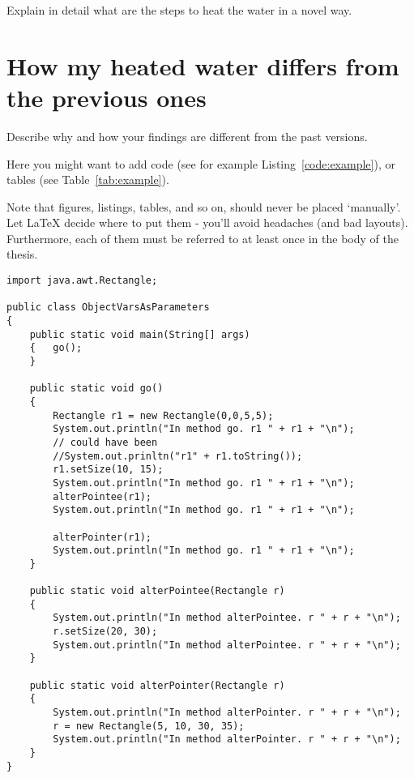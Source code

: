 Explain in detail what are the steps to heat the water in a novel way.

\section{How my heated water differs from the previous ones}

Describe why and how your findings are different from the past versions.

Here you might want to add code (see for example Listing~\ref{code:example}), or tables (see Table~\ref{tab:example}).

Note that figures, listings, tables, and so on, should never be placed `manually'. Let LaTeX decide where to put them - you'll avoid headaches (and bad layouts). Furthermore, each of them must be referred to at least once in the body of the thesis.

\begin{verbatim}
import java.awt.Rectangle;

public class ObjectVarsAsParameters
{	
    public static void main(String[] args)
    {	go();
    }
    
    public static void go()
    {	
        Rectangle r1 = new Rectangle(0,0,5,5);
        System.out.println("In method go. r1 " + r1 + "\n");
        // could have been 
        //System.out.prinltn("r1" + r1.toString());
        r1.setSize(10, 15);
        System.out.println("In method go. r1 " + r1 + "\n");
        alterPointee(r1);
        System.out.println("In method go. r1 " + r1 + "\n");
        
        alterPointer(r1);
        System.out.println("In method go. r1 " + r1 + "\n");
    }
    
    public static void alterPointee(Rectangle r)
    {	
        System.out.println("In method alterPointee. r " + r + "\n");
        r.setSize(20, 30);
        System.out.println("In method alterPointee. r " + r + "\n");
    }
    
    public static void alterPointer(Rectangle r)
    {	
        System.out.println("In method alterPointer. r " + r + "\n");
        r = new Rectangle(5, 10, 30, 35);
        System.out.println("In method alterPointer. r " + r + "\n");
    }
}
\end{verbatim}

